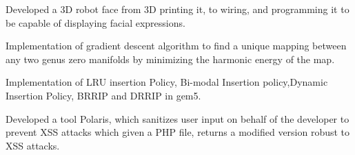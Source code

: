 \documentclass[hidelinks,letterpaper]{deedy-resume-openfont} %
\begin{document}
\begin{minipage}[t]{0.66\textwidth}
\small Developed a 3D robot face from 3D printing it, to wiring, and programming it to be capable of displaying facial expressions.

\small Implementation of gradient descent algorithm to find a unique mapping between any two genus zero manifolds by minimizing the harmonic energy of the map.

\small Implementation of LRU insertion Policy, Bi-modal Insertion policy,Dynamic Insertion Policy, BRRIP and DRRIP in gem5.



\small Developed a tool Polaris, which sanitizes user input on behalf of the developer to prevent XSS attacks which given a PHP file, returns a modified version robust to XSS attacks.









\end{minipage} %
\end{document}
